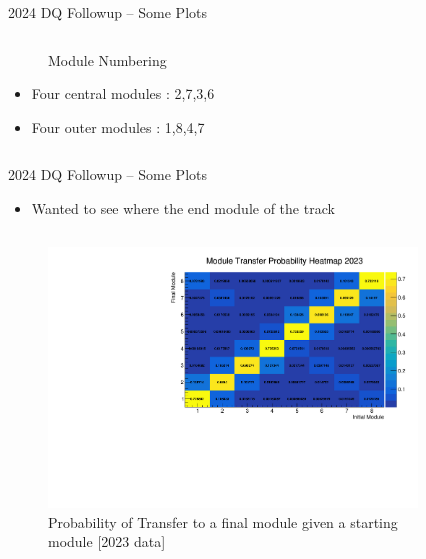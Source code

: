 \begin{frame}{2024 DQ Followup -- Some Plots}
\begin{columns}
\begin{column}{0.6 \textwidth}
\begin{figure}
            \caption{Module Numbering}
        \end{figure}
        \begin{itemize}
            \scriptsize
            \item Four central modules : 2,7,3,6
            \item Four outer modules : 1,8,4,7
        \end{itemize}
    \end{column}
\end{columns}
\end{frame}

\begin{frame}{2024 DQ Followup -- Some Plots}
    \begin{itemize}
        \item Wanted to see where the end module of the track
    \end{itemize}
    \begin{columns}
        \begin{column}{0.5\linewidth}
            \begin{figure}
                \includegraphics[width=\linewidth]{assets/st0_module_number vs st1_module_number_prob_2023.pdf}
                \caption{Probability of Transfer to a final module given a starting module [2023 data]}
            \end{figure}
        \end{column}
        \begin{column}{0.5\linewidth}
            \begin{figure}

\end{figure}
\end{column}
\end{columns}
\end{frame}
